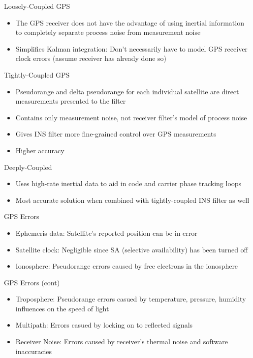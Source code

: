 \begin{frame}
Loosely-Coupled GPS
\begin{itemize}
  \item The GPS receiver does not have the advantage of using inertial information to completely separate process noise from measurement noise
  \item Simplifies Kalman integration: Don't necessarily have to model GPS receiver clock errors (assume receiver has already done so)
\end{itemize} 
\end{frame}

\begin{frame}
Tightly-Coupled GPS
\begin{itemize}
  \item Pseudorange and delta pseudorange for each individual satellite are direct measurements presented to the filter
  \item Contains only measurement noise, not receiver filter's model of process noise 
  \item Gives INS filter more fine-grained control over GPS measurements
  \item Higher accuracy
\end{itemize} 
\end{frame}

\begin{frame}
Deeply-Coupled
\begin{itemize}
  \item Uses high-rate inertial data to aid in code and carrier phase tracking loops
  \item Most accurate solution when combined with tightly-coupled INS filter as well
\end{itemize} 
\end{frame}

\begin{frame}
GPS Errors
\begin{itemize}
  \item Ephemeris data: Satellite's reported position can be in error
  \item Satellite clock:  Negligible since SA (selective availability) has been turned off
  \item Ionosphere:  Pseudorange errors caused by free electrons in the ionosphere
\end{itemize} 
\end{frame}

\begin{frame}
GPS Errors (cont)
\begin{itemize}
  \item Troposphere: Pseudorange errors casued by temperature, pressure, humidity influences on the speed of light
  \item Multipath:  Errors casued by locking on to reflected signals
  \item Receiver Noise: Errors caused by receiver's thermal noise and software inaccuracies
\end{itemize} 
\end{frame}

